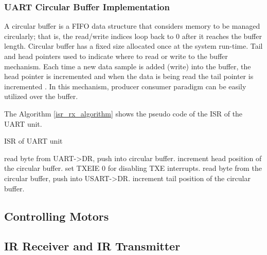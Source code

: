 \subsubsection{UART Circular Buffer Implementation}
\label{sec_uart_circular_buff}

A circular buffer is a FIFO data structure that considers memory to be managed circularly; that is, the read/write indices loop back to 0 after it reaches the buffer length. Circular buffer has a fixed size allocated once at the system run-time. Tail and head pointers used to indicate where to read or write to the buffer mechanism. Each time a new data sample is added (write) into the buffer, the head pointer is incremented and when the data is being read the tail pointer is incremented \cite{Ref_circ-buffer} \cite{Ref_circ_buffer_paper}. In this mechanism, producer consumer paradigm can be easily utilized over the buffer.

The Algorithm \ref{isr_rx_algorithm} shows the pseudo code of the ISR of the UART unit.

\begin{algorithm}
\caption{ISR of UART unit}
\label{isr_rx_algorithm}
    \begin{algorithmic}
        \State read byte from UART->DR, push into circular buffer.
        \State increment head position of the circular buffer.
    \EndIf
            \State set TXEIE 0 for disabling TXE interrupts.
            \State read byte from the circular buffer, push into USART->DR.
            \State increment tail position of the circular buffer.
        \EndIf
    \EndIf
    \end{algorithmic}
\end{algorithm}




\subsection{Controlling Motors} \label{sec_controlling_motors}

\subsection{IR Receiver and IR Transmitter} \label{sec_ir_rx_tx}

